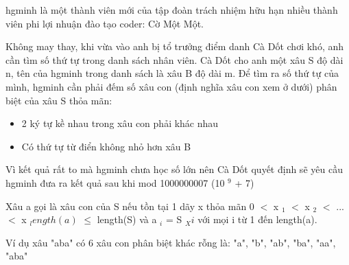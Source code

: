 hgminh là một thành viên mới của tập đoàn trách nhiệm hữu hạn nhiều thành viên phi lợi nhuận đào tạo coder: Cờ Một Một.  

   Không may thay, khi vừa vào anh bị tổ trưởng điểm danh Cà Dốt chơi khó, anh cần tìm số thứ tự trong danh sách nhân viên. Cà Dốt cho anh một xâu S độ dài n, tên của hgminh trong danh sách là xâu B độ dài m. Để tìm ra số thứ tự của mình, hgminh cần phải đếm số xâu con (định nghĩa xâu con xem ở dưới) phân biệt của xâu S thỏa mãn:  
\begin{itemize}
	\item     2 ký tự kề nhau trong xâu con phải khác nhau   
	\item     Có thứ tự từ điển không nhỏ hơn xâu B   
\end{itemize}

   Vì kết quả rất to mà hgminh chưa học số lớn nên Cà Dốt quyết định sẽ yêu cầu hgminh đưa ra kết quả sau khi mod 1000000007 (10   $^    9   $   + 7)  



   Xâu a gọi là xâu con của S nếu tồn tại 1 dãy x thỏa mãn 0 $<$ x   $_    1   $   $<$ x   $_    2   $   $<$ ...$<$ x   $_    length(a)   $    $\le$  length(S) và a   $_    i   $   = S   $_    Xi   $   với mọi i từ 1 đến length(a).  

   Ví dụ xâu "aba" có 6 xâu con phân biệt khác rỗng là: "a", "b", "ab", "ba", "aa", "aba"